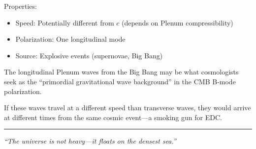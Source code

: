 Properties:
\begin{itemize}
    \item Speed: Potentially different from $c$ (depends on Plenum compressibility)
    \item Polarization: One longitudinal mode
    \item Source: Explosive events (supernovae, Big Bang)
\end{itemize}

\begin{tcolorbox}[colback=yellow!10,colframe=orange!80!black,title=Primordial Gravitational Waves]
The longitudinal Plenum waves from the Big Bang may be what cosmologists seek as the ``primordial gravitational wave background'' in the CMB B-mode polarization.

If these waves travel at a different speed than transverse waves, they would arrive at different times from the same cosmic event---a smoking gun for EDC.
\end{tcolorbox}

\vspace{2em}
\begin{center}
\rule{0.5\textwidth}{0.4pt}

\textit{``The universe is not heavy---it floats on the densest sea.''}
\end{center}
